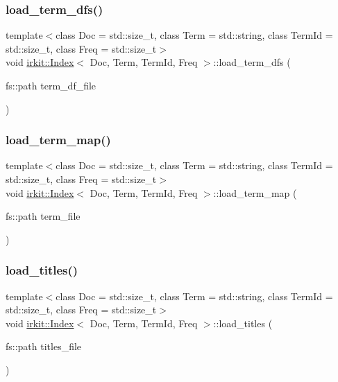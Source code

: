\subsubsection{\texorpdfstring{load\+\_\+term\+\_\+dfs()}{load\_term\_dfs()}}
{\footnotesize\ttfamily template$<$class Doc  = std\+::size\+\_\+t, class Term  = std\+::string, class Term\+Id  = std\+::size\+\_\+t, class Freq  = std\+::size\+\_\+t$>$ \\
void \hyperlink{classirkit_1_1Index}{irkit\+::\+Index}$<$ Doc, Term, Term\+Id, Freq $>$\+::load\+\_\+term\+\_\+dfs (\begin{DoxyParamCaption}\item[{fs\+::path}]{term\+\_\+df\+\_\+file }\end{DoxyParamCaption})\hspace{0.3cm}{\ttfamily [inline]}}

\mbox{\label{classirkit_1_1Index_a2071c83ea3a4f128ea624fea8a24c9c9}} 
\subsubsection{\texorpdfstring{load\+\_\+term\+\_\+map()}{load\_term\_map()}}
{\footnotesize\ttfamily template$<$class Doc  = std\+::size\+\_\+t, class Term  = std\+::string, class Term\+Id  = std\+::size\+\_\+t, class Freq  = std\+::size\+\_\+t$>$ \\
void \hyperlink{classirkit_1_1Index}{irkit\+::\+Index}$<$ Doc, Term, Term\+Id, Freq $>$\+::load\+\_\+term\+\_\+map (\begin{DoxyParamCaption}\item[{fs\+::path}]{term\+\_\+file }\end{DoxyParamCaption})\hspace{0.3cm}{\ttfamily [inline]}}

\mbox{\label{classirkit_1_1Index_acd33c3a279e165a71594843d70e281f1}} 
\subsubsection{\texorpdfstring{load\+\_\+titles()}{load\_titles()}}
{\footnotesize\ttfamily template$<$class Doc  = std\+::size\+\_\+t, class Term  = std\+::string, class Term\+Id  = std\+::size\+\_\+t, class Freq  = std\+::size\+\_\+t$>$ \\
void \hyperlink{classirkit_1_1Index}{irkit\+::\+Index}$<$ Doc, Term, Term\+Id, Freq $>$\+::load\+\_\+titles (\begin{DoxyParamCaption}\item[{fs\+::path}]{titles\+\_\+file }\end{DoxyParamCaption})\hspace{0.3cm}{\ttfamily [inline]}}

